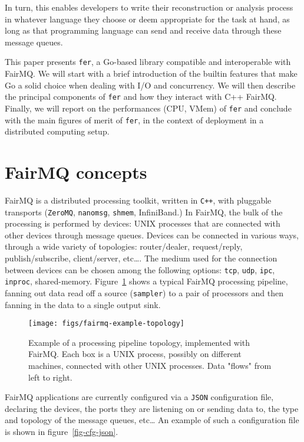 \documentclass{webofc}
\begin{document}
In turn, this enables developers to write their reconstruction or analysis process in whatever language they choose or deem appropriate for the task at hand, as long as that programming language can send and receive data through these message queues.

This paper presents \texttt{fer}, a Go-based library compatible and interoperable with FairMQ.
We will start with a brief introduction of the builtin features that make Go a solid choice when dealing with I/O and concurrency.
We will then describe the principal components of \texttt{fer} and how they interact with C++ FairMQ.
Finally, we will report on the performances (CPU, VMem) of \texttt{fer} and conclude with the main figures of merit of \texttt{fer}, in the context of deployment in a distributed computing setup.

\section{FairMQ concepts}
\label{sec-fairmq-concepts}

FairMQ is a distributed processing toolkit, written in \texttt{C++}, with pluggable transports (\texttt{ZeroMQ}, \texttt{nanomsg}, \texttt{shmem}, InfiniBand.)
In FairMQ, the bulk of the processing is performed by devices: UNIX processes that are connected with other devices through message queues.
Devices can be connected in various ways, through a wide variety of topologies: router/dealer, request/reply, publish/subscribe, client/server, etc\ldots.
The medium used for the connection between devices can be chosen among the following options: \texttt{tcp}, \texttt{udp}, \texttt{ipc}, \texttt{inproc}, shared-memory.
Figure~\ref{fig-topology} shows a typical FairMQ processing pipeline, fanning out data read off a source (\texttt{sampler}) to a pair of processors and then fanning in the data to a single output sink.

\begin{figure}[h]
\centering
\texttt{[image: figs/fairmq-example-topology]}
\caption{Example of a processing pipeline topology, implemented with FairMQ. Each box is a UNIX process, possibly on different machines, connected with other UNIX processes. Data "flows" from left to right.}
\label{fig-topology}
\end{figure}

FairMQ applications are currently configured via a \texttt{JSON} configuration file, declaring the devices, the ports they are listening on or sending data to, the type and topology of the message queues, etc\ldots
An example of such a configuration file is shown in figure~\ref{fig-cfg-json}.
\end{document}
